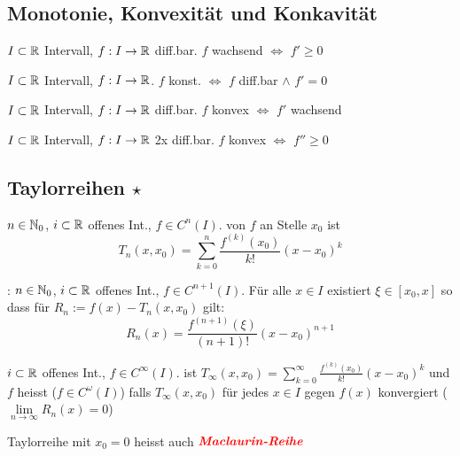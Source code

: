 \subsection{Monotonie, Konvexität und Konkavität}

\Satz $I \subset \mathbb{R}$ Intervall, $f: I \to \mathbb{R}$ diff.bar.
$f$ wachsend $\iff$ $f' \ge 0$

\Kor $I \subset \mathbb{R}$ Intervall, $f: I \to \mathbb{R}$.
$f$ konst. $\iff$ $f$ diff.bar $\land$ $f' = 0$

\Satz $I \subset \mathbb{R}$ Intervall, $f: I \to \mathbb{R}$ diff.bar.
$f$ konvex $\iff$ $f'$ wachsend

\Kor $I \subset \mathbb{R}$ Intervall, $f: I \to \mathbb{R}$ 2x diff.bar.
$f$ konvex $\iff$ $f'' \ge 0$

\subsection{Taylorreihen \texorpdfstring{$\star$}{*}}

\Def $n \in \mathbb{N}_0$, $i \subset \mathbb{R}$ offenes Int., $f \in C^n(I)$.  von $f$
an Stelle $x_0$ ist
$$T_n(x, x_0) = \sum_{k=0}^{n}\frac{f^{(k)}(x_0)}{k!}(x-x_0)^k$$ 

\Satz {}: $n \in \mathbb{N}_0$, $i \subset \mathbb{R}$ offenes Int., $f \in C^{n+1}(I)$. Für alle $x \in I$
existiert  $\xi \in [x_0, x]$ so dass für $R_n := f(x) - T_n(x, x_0)$ gilt:
$$R_n(x) = \frac{f^{(n+1)}(\xi)}{(n+1)!}(x-x_0)^{n+1}$$

\Def $i \subset \mathbb{R}$ offenes Int., $f \in C^\infty(I)$.  ist 
$T_\infty(x, x_0) = \sum_{k=0}^{\infty}\frac{f^{(k)}(x_0)}{k!}(x-x_0)^k$
und $f$ heisst  ($f \in C^\omega(I)$) falls $T_\infty(x, x_0)$ für jedes
$x \in I$ gegen $f(x)$ konvergiert ($\lim\limits_{n\to\infty} R_n(x) = 0$)

\Def Taylorreihe mit $x_0 = 0$ heisst auch $\textbf{\textit{\color{red}{Maclaurin-Reihe}}}$

